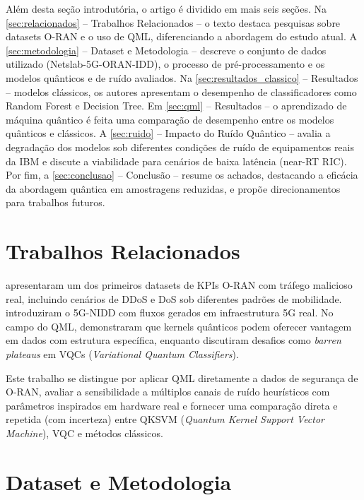 \documentclass[12pt]{article}
\begin{document}
Além desta seção introdutória, o artigo é dividido em mais seis seções. Na \autoref{sec:relacionados} -- Trabalhos Relacionados -- o texto destaca pesquisas sobre datasets O-RAN e o uso de QML, diferenciando a abordagem do estudo atual. A \autoref{sec:metodologia} -- Dataset e Metodologia -- descreve o conjunto de dados utilizado (Netslab-5G-ORAN-IDD), o processo de pré-processamento e os modelos quânticos e de ruído avaliados. Na \autoref{sec:resultados_classico} -- Resultados --  modelos clássicos, os autores apresentam o desempenho de classificadores como Random Forest e Decision Tree. Em \autoref{sec:qml} -- Resultados -- o aprendizado de máquina quântico é feita uma comparação de desempenho entre os modelos quânticos e clássicos. A \autoref{sec:ruido} -- Impacto do Ruído Quântico -- avalia a degradação dos modelos sob diferentes condições de ruído de equipamentos reais da IBM e discute a viabilidade para cenários de baixa latência (near-RT RIC). Por fim, a \autoref{sec:conclusao} -- Conclusão -- resume os achados, destacando a eficácia da abordagem quântica em amostragens reduzidas, e propõe direcionamentos para trabalhos futuros.


\section{Trabalhos Relacionados}
\label{sec:relacionados}

\cite{openireland2024} apresentaram um dos primeiros datasets de KPIs O-RAN com tráfego malicioso real, incluindo cenários de DDoS e DoS sob diferentes padrões de mobilidade. \cite{nidd2022} introduziram o 5G-NIDD com fluxos gerados em infraestrutura 5G real. No campo do QML, \cite{liu2021} demonstraram que kernels quânticos podem oferecer vantagem em dados com estrutura específica, enquanto \cite{cerezo2021} discutiram desafios como \textit{barren plateaus} em VQCs (\textit{Variational Quantum Classifiers}). 

Este trabalho se distingue por aplicar QML diretamente a dados de segurança de O-RAN, avaliar a sensibilidade a múltiplos canais de ruído heurísticos com parâmetros inspirados em hardware real e fornecer uma comparação direta e repetida (com incerteza) entre QKSVM (\textit{Quantum Kernel Support Vector Machine}), VQC e métodos clássicos.


\section{Dataset e Metodologia}
\label{sec:metodologia}
\end{document}

